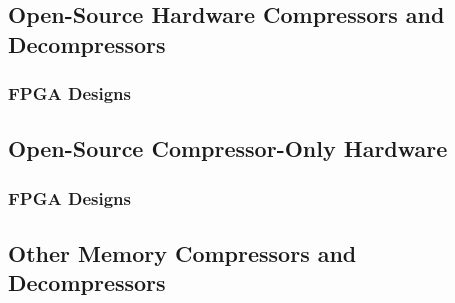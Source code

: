 \documentclass[doublespace,draft,nopageskip]{VTthesis} %
\begin{document}
\subsection{Open-Source Hardware Compressors and Decompressors}\label{ss:open-source_hardware_compressors_and_decompressors}
\subsubsection{FPGA Designs}\label{sss:fpga_designs}

\subsection{Open-Source Compressor-Only Hardware}\label{ss:open-source_compressor-only_hardware}
\subsubsection{FPGA Designs}\label{sss:fpga_designs}

\subsection{Other Memory Compressors and Decompressors}\label{ss:other_memory_compressors_and_decompressors}

\cite{compresso}


\end{document}
